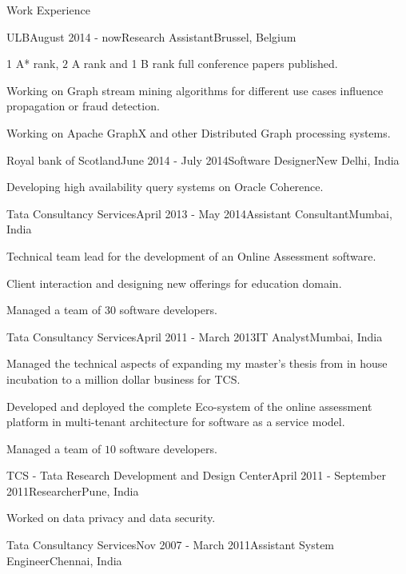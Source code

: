 \documentclass{resume} %
\begin{document}
\begin{rSection}{Work Experience}
\begin{rSubsection}{ULB}{August 2014 - now}{Research Assistant}{Brussel, Belgium}
\item 1 A* rank, $2$ A rank and 1 B rank full conference papers published.
\item Working on Graph stream mining algorithms for different use cases influence propagation or fraud detection.
\item Working on Apache GraphX and other Distributed Graph processing systems.
\end{rSubsection}
\begin{rSubsection}{Royal bank of Scotland}{June 2014 - July 2014}{Software Designer}{New Delhi, India}
\item Developing high availability query systems on Oracle Coherence.
\end{rSubsection}
\begin{rSubsection}{Tata Consultancy Services}{April 2013 - May 2014}{Assistant Consultant}{Mumbai, India}
\item Technical team lead for the development of an Online Assessment software. 
\item Client interaction and designing new offerings for education domain.
\item Managed a team of $30$ software developers.  
\end{rSubsection}
\begin{rSubsection}{Tata Consultancy Services}{April 2011 - March 2013}{IT Analyst}{Mumbai, India}
\item Managed the technical aspects of expanding my master's thesis from in house incubation to a million dollar business for TCS.
\item Developed and deployed the complete Eco-system of the online assessment platform in multi-tenant architecture for software as a service model.
\item Managed a team of $10$ software developers.  
\end{rSubsection}
\begin{rSubsection}{TCS - Tata Research Development and Design Center}{April 2011 - September 2011}{Researcher}{Pune, India}
\item Worked on data privacy and data security.
\end{rSubsection}
\begin{rSubsection}{Tata Consultancy Services}{Nov 2007 - March 2011}{Assistant System Engineer}{Chennai, India}

\end{rSubsection}
\end{rSection}
\end{document}
